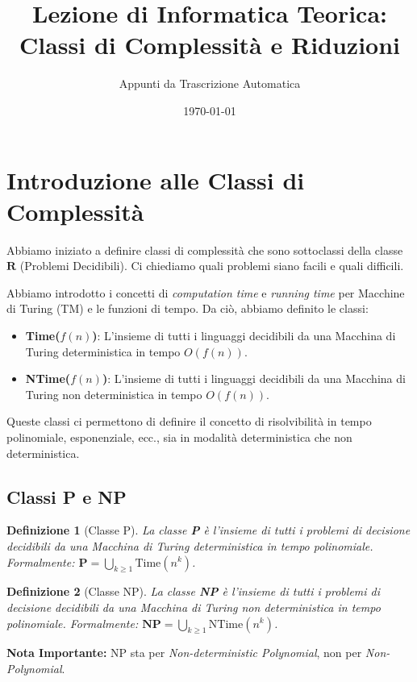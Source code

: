 \documentclass[a4paper]{article}
\title{Lezione di Informatica Teorica: Classi di Complessità e Riduzioni}
\author{Appunti da Trascrizione Automatica}
\date{\today}
\newtheorem{definition}{Definizione}
\begin{document}
\maketitle
\tableofcontents
\newpage

\section{Introduzione alle Classi di Complessità}

Abbiamo iniziato a definire classi di complessità che sono sottoclassi della classe $\mathbf{R}$ (Problemi Decidibili). Ci chiediamo quali problemi siano facili e quali difficili.

Abbiamo introdotto i concetti di \emph{computation time} e \emph{running time} per Macchine di Turing (TM) e le funzioni di tempo. Da ciò, abbiamo definito le classi:
\begin{itemize}
    \item \textbf{Time($f(n)$)}: L'insieme di tutti i linguaggi decidibili da una Macchina di Turing deterministica in tempo $O(f(n))$.
    \item \textbf{NTime($f(n)$)}: L'insieme di tutti i linguaggi decidibili da una Macchina di Turing non deterministica in tempo $O(f(n))$.
\end{itemize}

Queste classi ci permettono di definire il concetto di risolvibilità in tempo polinomiale, esponenziale, ecc., sia in modalità deterministica che non deterministica.

\subsection{Classi P e NP}

\begin{definition}[Classe P]
La classe \textbf{P} è l'insieme di tutti i problemi di decisione decidibili da una Macchina di Turing deterministica in tempo polinomiale.
Formalmente: $\mathbf{P} = \bigcup_{k \ge 1} \text{Time}(n^k)$.
\end{definition}

\begin{definition}[Classe NP]
La classe \textbf{NP} è l'insieme di tutti i problemi di decisione decidibili da una Macchina di Turing non deterministica in tempo polinomiale.
Formalmente: $\mathbf{NP} = \bigcup_{k \ge 1} \text{NTime}(n^k)$.
\end{definition}

\textbf{Nota Importante:} NP sta per \emph{Non-deterministic Polynomial}, non per \emph{Non-Polynomial}.
\end{document}
